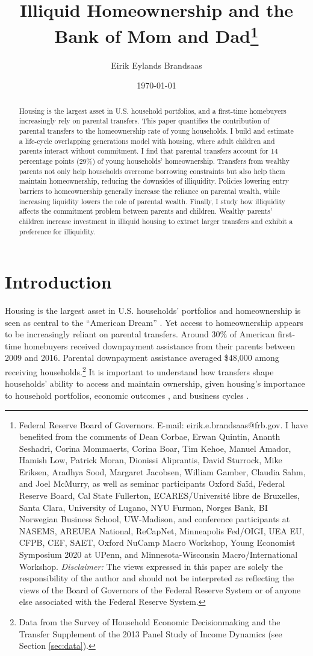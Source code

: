 \documentclass[12pt]{article}
\title{{\LARGE Illiquid Homeownership and  the \\  Bank of Mom and Dad}\thanks{Federal Reserve Board of Governors.  E-mail: eirik.e.brandsaas@frb.gov. I have benefited from the comments of Dean Corbae, Erwan Quintin, Ananth Seshadri, Corina Mommaerts,  Corina Boar, Tim Kehoe, Manuel Amador, Hamish Low, Patrick Moran, Dionissi Aliprantis, David Sturrock, Mike Eriksen, Aradhya Sood, Margaret Jacobsen, William Gamber, Claudia Sahm, and Joel McMurry, as well as seminar participants Oxford Sa{\"i}d, Federal Reserve Board, Cal State Fullerton, ECARES/Université libre de Bruxelles, Santa Clara, University of Lugano, NYU Furman, Norges Bank, BI Norwegian Business School, UW-Madison, and conference participants at NASEMS, AREUEA National, ReCapNet, Minneapolis Fed/OIGI, UEA EU, CFPB, CEF, SAET, Oxford NuCamp Macro Workshop, Young Economist Symposium 2020 at UPenn, and Minnesota-Wisconsin Macro/International Workshop. \textit{Disclaimer: }The views expressed in this paper are solely the responsibility of the author and should not be interpreted as reflecting the views of the Board of Governors of the Federal Reserve System or of anyone else associated with the Federal Reserve System.}}
\author{Eirik Eylands Brandsaas}
\date{{\today }}
\begin{document}
\maketitle
\begin{abstract}
{\begin{spacing}{1.2}
Housing is the largest asset in U.S. household portfolios, and a first-time homebuyers increasingly rely on parental transfers. This paper quantifies the contribution of parental transfers to the homeownership rate of young households. I build and estimate a life-cycle overlapping generations model with housing, where adult children and parents interact without commitment. I find that parental transfers account for 14 percentage points (29\%) of young households' homeownership. Transfers from wealthy parents not only help households overcome borrowing constraints but also help them maintain homeownership, reducing the downsides of illiquidity. Policies lowering entry barriers to homeownership generally increase the reliance on parental wealth, while increasing liquidity lowers the role of parental wealth. Finally, I study how illiquidity affects the commitment problem  between parents and children. Wealthy parents' children increase investment in illiquid housing to extract larger transfers and exhibit a preference for illiquidity.
\end{spacing}}
\end{abstract}
\newpage
\onehalfspacing

\section{Introduction}
Housing is the largest asset in U.S. households' portfolios and homeownership is seen as central to the ``American Dream'' \citep{goodman2018homeownership}. Yet access to homeownership appears to be increasingly reliant on parental transfers. Around 30\% of American first-time homebuyers received downpayment assistance from their parents between 2009 and 2016. Parental downpayment assistance averaged \$48,000 among receiving households.\footnote{Data from the Survey of Household Economic Decisionmaking and the Transfer Supplement of the 2013  Panel Study of Income Dynamics (see Section \ref{sec:data}).}  It is important to understand how transfers shape households' ability to access and maintain ownership, given  housing’s importance to household portfolios, economic outcomes \citep{sodini2023identifying}, and business cycles \citep{Kaplan2020,favilukis2017macroeconomic}.
\end{document}

